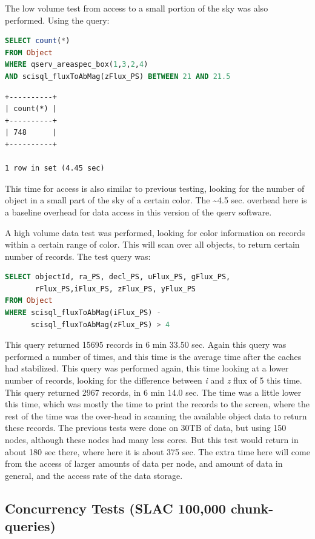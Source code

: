 \documentclass[DM,lsstdraft,toc]{lsstdoc}
\begin{document}
The low volume test from access to a small portion of the sky was also
performed. Using the query:

\begin{lstlisting}[language=SQL]
SELECT count(*)
FROM Object
WHERE qserv_areaspec_box(1,3,2,4)
AND scisql_fluxToAbMag(zFlux_PS) BETWEEN 21 AND 21.5
\end{lstlisting}

\begin{verbatim}
+----------+
| count(*) |
+----------+
| 748      |
+----------+

1 row in set (4.45 sec)
\end{verbatim}

This time for access is also similar to previous testing, looking for
the number of object in a small part of the sky of a certain color. The
\textasciitilde{}4.5 sec. overhead here is a baseline overhead for data
access in this version of the qserv software.

A high volume data test was performed, looking for color information on
records within a certain range of color. This will scan over all
objects, to return certain number of records. The test query was:

\begin{lstlisting}[language=SQL]
SELECT objectId, ra_PS, decl_PS, uFlux_PS, gFlux_PS,
       rFlux_PS,iFlux_PS, zFlux_PS, yFlux_PS
FROM Object
WHERE scisql_fluxToAbMag(iFlux_PS) -
      scisql_fluxToAbMag(zFlux_PS) > 4
\end{lstlisting}

This query returned 15695 records in 6 min 33.50 sec. Again this query
was performed a number of times, and this time is the average time after
the caches had stabilized. This query was performed again, this time
looking at a lower number of records, looking for the difference between
\emph{i} and \emph{z} flux of 5 this time. This query returned 2967
records, in 6 min 14.0 sec. The time was a little lower this time, which
was mostly the time to print the records to the screen, where the rest
of the time was the over-head in scanning the available object data to
return these records. The previous tests were done on 30TB of data, but
using 150 nodes, although these nodes had many less cores. But this test
would return in about 180 sec there, where here it is about 375 sec. The
extra time here will come from the access of larger amounts of data per
node, and amount of data in general, and the access rate of the data
storage.

\subsection{Concurrency Tests (SLAC 100,000
chunk-queries)}\label{concurrency-tests-slac-100000-chunk-queries}
\end{document}
